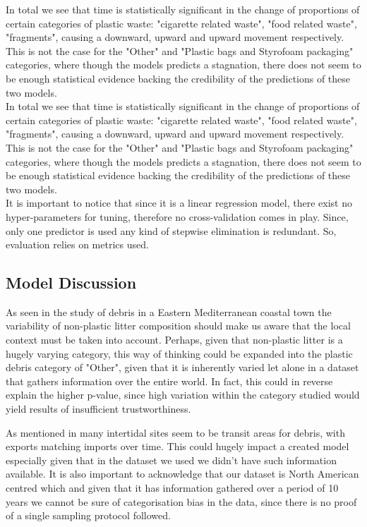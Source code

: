 \documentclass[10pt]{article}\usepackage[]{graphicx}\usepackage[]{color}
\begin{document}
In total we see that time is statistically significant in the change of proportions of certain categories
of plastic waste: "cigarette related waste", "food related waste", "fragments", causing a downward, upward and upward movement respectively. This is not the case for the "Other" and "Plastic bags and Styrofoam packaging" categories, where though the models predicts a stagnation, there does not seem to be enough statistical evidence backing the credibility of the predictions of these two models.\\


In total we see that time is statistically significant in the change of proportions of certain categories of plastic waste: "cigarette related waste", "food related waste", "fragments", causing a downward, upward and upward movement respectively. This is not the case for the "Other" and "Plastic bags and Styrofoam packaging" categories, where though the models predicts a stagnation, there does not seem to be enough statistical evidence backing the credibility of the predictions of these two models.\\

It is important to notice that since it is a linear regression model, there exist no hyper-parameters for tuning, therefore no cross-validation comes in play. Since, only one predictor is used any kind of stepwise elimination is redundant. So, evaluation relies on metrics used.\\




\subsection{Model Discussion}


As seen in the study of debris in a Eastern Mediterranean coastal town \cite{PORTMAN2017} the variability of non-plastic litter composition should make us aware that the local context must be taken into account. Perhaps, given that non-plastic litter is a hugely varying category, this way of thinking could be expanded into the plastic debris category of "Other", given that it is inherently varied let alone in a dataset that gathers information over the entire world. In fact, this could in reverse explain the higher p-value, since high variation within the category studied would yield results of insufficient trustworthiness. 

As mentioned in \cite{BROWNE2015} many intertidal sites seem to be transit areas for debris, with exports matching imports over time. This could hugely impact a created model especially given that in the dataset we used we didn't have such information available. It is also important to acknowledge that our dataset is North American centred which and given that it has information gathered over a period of 10 years we cannot be sure of categorisation bias in the data, since there is no proof of a single sampling protocol followed. 
\end{document}
